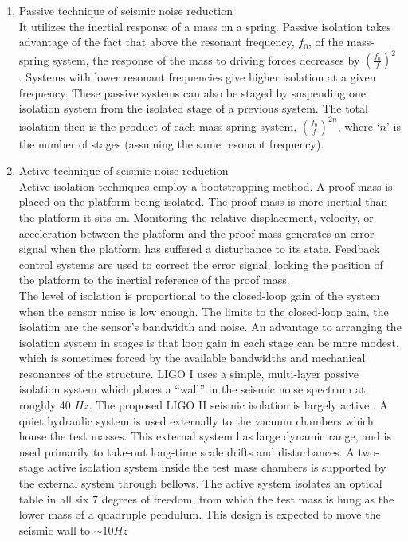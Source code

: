 \begin{enumerate}
    \item Passive technique of seismic noise reduction \\ 
    
    It utilizes the inertial response of a mass on a spring. Passive isolation takes advantage of the fact that above the resonant frequency, $f_0$, of the mass-spring system, the response of the mass to driving forces decreases by $(\frac{f_0}{f})^2$ . Systems with lower resonant frequencies give higher isolation at a given frequency. These passive systems can also be staged by suspending one isolation system from the isolated stage of a previous system. The total isolation then is the product of each mass-spring system, $(\frac{f_0}{f})^{2n}$, where `$n$' is the number of stages (assuming the same resonant frequency).
    
    \item Active technique of seismic noise reduction \\
    
    Active isolation techniques employ a bootstrapping method. A proof mass is placed on the platform being isolated. The proof mass is more inertial than the platform it sits on. Monitoring the relative displacement, velocity, or acceleration between the platform and the proof mass generates an error signal when the platform has suffered a disturbance to its state. Feedback control systems are used to correct the error signal, locking the position of the platform to the inertial reference of the proof mass. \\
    The level of isolation is proportional to the closed-loop gain of the system when the sensor noise is low enough. The limits to the closed-loop gain, the isolation are the sensor’s bandwidth and noise. An advantage to arranging the isolation system in stages is that loop gain in each stage can be more modest, which is sometimes forced by the available bandwidths and mechanical resonances of the structure. LIGO I uses a simple, multi-layer passive isolation system which places a “wall” in the seismic noise spectrum at roughly 40 $Hz$. The proposed LIGO II seismic isolation is largely active \cite{giaime2000active}. A quiet hydraulic system is used externally to the vacuum chambers which house the test masses. This external system has large dynamic range, and is used primarily to take-out long-time scale drifts and disturbances. A two-stage active isolation system inside the test mass chambers is supported by the external system through bellows. The active system isolates an optical table in all six 7 degrees of freedom, from which the test mass is hung as the lower mass of a quadruple pendulum. This design is expected to move the seismic wall to $ \sim 10 Hz$
\end{enumerate}

